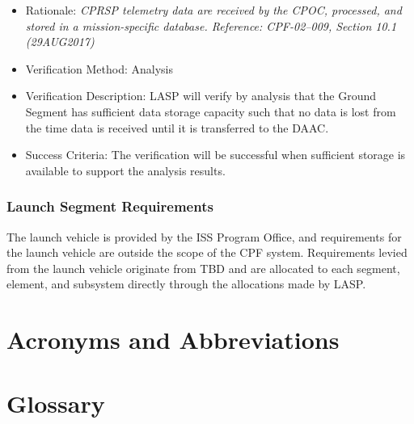 \begin{itemize}
\item{} Rationale: \emph{CPRSP telemetry data are received by the CPOC, processed, and stored in a mission-specific database. Reference: CPF-02--009, Section 10.1 (29AUG2017)}

\item{} Verification Method: Analysis

\item{} Verification Description: \gls{LASP} will verify by \gls{analysis} that the Ground Segment has sufficient data storage capacity such that no data is lost from the time data is received until it is transferred to the \gls{DAAC}.

\item{} Success Criteria: The verification will be successful when sufficient storage is available to support the \gls{analysis} results.

\end{itemize}

\subsection{Launch Segment Requirements}
\label{launchsegmentrequirements}

The launch vehicle is provided by the \gls{ISS} Program Office, and requirements for the launch vehicle are outside the scope of the \gls{CPF} system. Requirements levied from the launch vehicle originate from TBD\label{tbx_2} and are allocated to each segment, element, and subsystem directly through the allocations made by \gls{LASP}.


\begin{appendices}


\chapter{Acronyms and Abbreviations  }
\label{sec_acros}

\printglossary[type=\acronymtype]

\chapter{Glossary  }
\label{sec_gls}


\renewcommand{\entryname}{Term}
\renewcommand{\descriptionname}{Definition}
\printglossary


\end{appendices}




